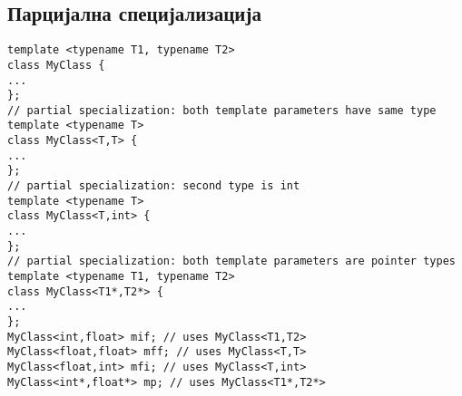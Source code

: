 \subsection{Парцијална специјализација}

\begin{lstlisting}
template <typename T1, typename T2>
class MyClass {
...
};
// partial specialization: both template parameters have same type
template <typename T>
class MyClass<T,T> {
...
};
// partial specialization: second type is int
template <typename T>
class MyClass<T,int> {
...
};
// partial specialization: both template parameters are pointer types
template <typename T1, typename T2>
class MyClass<T1*,T2*> {
...
};
MyClass<int,float> mif; // uses MyClass<T1,T2>
MyClass<float,float> mff; // uses MyClass<T,T>
MyClass<float,int> mfi; // uses MyClass<T,int>
MyClass<int*,float*> mp; // uses MyClass<T1*,T2*>

\end{lstlisting}


